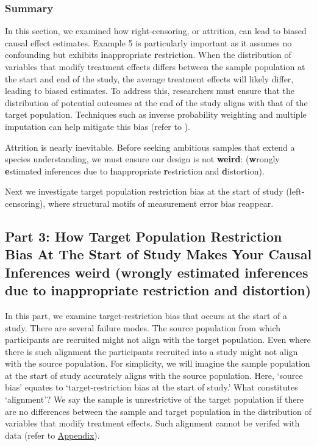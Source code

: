 \documentclass[
  single column]{article}
\begin{document}
\subsubsection{Summary}\label{summary-1}

In this section, we examined how right-censoring, or attrition, can lead
to biased causal effect estimates. Example 5 is particularly important
as it assumes no confounding but exhibits \textbf{i}nappropriate
\textbf{r}estriction. When the distribution of variables that modify
treatment effects differs between the sample population at the start and
end of the study, the average treatment effects will likely differ,
leading to biased estimates. To address this, researchers must ensure
that the distribution of potential outcomes at the end of the study
aligns with that of the target population. Techniques such as inverse
probability weighting and multiple imputation can help mitigate this
bias (refer to ).

Attrition is nearly inevitable. Before seeking ambitious samples that
extend a species understanding, we must ensure our design is not
\textbf{weird}: (\textbf{w}rongly \textbf{e}stimated inferences due to
\textbf{i}nappropriate \textbf{r}estriction and \textbf{d}istortion).

Next we investigate target population restriction bias at the start of
study (left-censoring), where structural motifs of measurement error
bias reappear.

\newpage{}

\subsection{\texorpdfstring{Part 3: How Target Population Restriction
Bias At The Start of Study Makes Your Causal Inferences weird
(\textbf{w}rongly \textbf{e}stimated inferences due to
\textbf{i}nappropriate \textbf{r}estriction and
\textbf{d}istortion)}{Part 3: How Target Population Restriction Bias At The Start of Study Makes Your Causal Inferences weird (wrongly estimated inferences due to inappropriate restriction and distortion)}}\label{id-sec-3}

In this part, we examine target-restriction bias that occurs at the
start of a study. There are several failure modes. The source population
from which participants are recruited might not align with the target
population. Even where there is such alignment the participants
recruited into a study might not align with the source population. For
simplicity, we will imagine the sample population at the start of study
accurately aligns with the source population. Here, `source bias'
equates to `target-restriction bias at the start of study.' What
constitutes `alignment'? We say the sample is unrestrictive of the
target population if there are no differences between the sample and
target population in the distribution of variables that modify treatment
effects. Such alignment cannot be verifed with data (refer to
\hyperref[id-app-c]{Appendix}).
\end{document}
